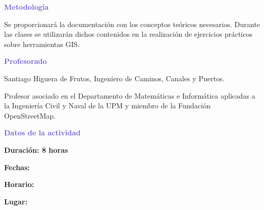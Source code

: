 \documentclass[10pt, oneside]{article}
\begin{document}
\vspace{1em}
\hspace*{-2em}\textbf{\textcolor{SlateBlue}{Metodología}}

Se proporcionará la documentación con los conceptos teóricos necesarios. Durante las clases se utilizarán dichos contenidos en la realización de ejercicios prácticos sobre herramientas GIS.

\hspace*{-2em}\textbf{\textcolor{SlateBlue}{Profesorado}}

Santiago Higuera de Frutos, Ingeniero de Caminos, Canales y Puertos.

Profesor asociado en el Departamento de Matemáticas e Informática aplicadas a la Ingeniería Civil y Naval de la UPM y miembro de la Fundación OpenStreetMap.

\vspace{1em}
\hspace*{-2em}\textbf{\textcolor{SlateBlue}{Datos de la actividad}}

\textbf{Duración: 8 horas} 

\textbf{Fechas:} 

\textbf{Horario:} 

\textbf{Lugar:} 
\end{document}
